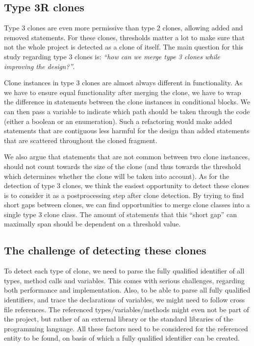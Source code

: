 \documentclass[a4paper]{article}
\begin{document}
\subsection{Type 3R clones}
Type 3 clones are even more permissive than type 2 clones, allowing added and removed statements. For these clones, thresholds matter a lot to make sure that not the whole project is detected as a clone of itself. The main question for this study regarding type 3 clones is: \textit{``how can we merge type 3 clones while improving the design?''}.

Clone instances in type 3 clones are almost always different in functionality. As we have to ensure equal functionality after merging the clone, we have to wrap the difference in statements between the clone instances in conditional blocks. We can then pass a variable to indicate which path should be taken through the code (either a boolean or an enumeration). Such a refactoring would make added statements that are contiguous less harmful for the design than added statements that are scattered throughout the cloned fragment.

We also argue that statements that are not common between two clone instances, should not count towards the size of the clone (and thus towards the threshold which determines whether the clone will be taken into account). As for the detection of type 3 clones, we think the easiest opportunity to detect these clones is to consider it as a postprocessing step after clone detection. By trying to find short gaps between clones, we can find opportunities to merge clone classes into a single type 3 clone class. The amount of statements that this ``short gap'' can maximally span should be dependent on a threshold value.

\subsection{The challenge of detecting these clones}\label{chap:challenge}
To detect each type of clone, we need to parse the fully qualified identifier of all types, method calls and variables. This comes with serious challenges, regarding both performance and implementation. Also, to be able to parse all fully qualified identifiers, and trace the declarations of variables, we might need to follow cross file references. The referenced types/variables/methods might even not be part of the project, but rather of an external library or the standard libraries of the programming language. All these factors need to be considered for the referenced entity to be found, on basis of which a fully qualified identifier can be created.
\end{document}
